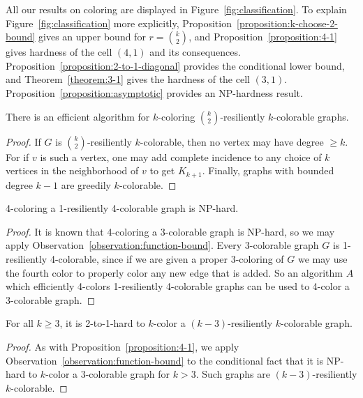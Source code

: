 All our results on coloring are displayed in Figure~\ref{fig:classification}.
To explain Figure~\ref{fig:classification} more explicitly,
Proposition~\ref{proposition:k-choose-2-bound} gives an upper bound for $r=
\binom{k}{2}$, and Proposition~\ref{proposition:4-1} gives hardness of the cell
$(4,1)$ and its consequences. Proposition~\ref{proposition:2-to-1-diagonal} provides
the conditional lower bound, and Theorem~\ref{theorem:3-1} gives the hardness of
the cell $(3,1)$. Proposition~\ref{proposition:asymptotic} provides an NP-hardness
result.

\begin{proposition}\label{proposition:k-choose-2-bound}
There is an efficient algorithm for $k$-coloring $\binom{k}{2}$-resiliently
$k$-colorable graphs.
\end{proposition}
\begin{proof}
If $G$ is $\binom{k}{2}$-resiliently $k$-colorable, then no vertex may have
degree $ \geq k$. For if $v$ is such a vertex, one may add complete incidence to
any choice of $k$ vertices in the neighborhood of $v$ to get $K_{k+1}$. Finally,
graphs with bounded degree $k-1$ are greedily $k$-colorable. 
\end{proof}

\begin{proposition}\label{proposition:4-1}
4-coloring a 1-resiliently 4-colorable graph is NP-hard.
\end{proposition}
\begin{proof}
It is known that 4-coloring a 3-colorable graph is NP-hard, so we may apply
Observation~\ref{observation:function-bound}. Every 3-colorable graph $G$ is
1-resiliently 4-colorable, since if we are given a proper 3-coloring of $G$ we
may use the fourth color to properly color any new edge that is added. So an
algorithm $A$ which efficiently 4-colors 1-resiliently 4-colorable graphs can
be used to 4-color a 3-colorable graph. 
\end{proof}

\begin{proposition}\label{proposition:2-to-1-diagonal}
For all $k \geq 3$, it is 2-to-1-hard to $k$-color a $(k-3)$-resiliently
$k$-colorable graph. 
\end{proposition}
\begin{proof}
As with Proposition~\ref{proposition:4-1}, we apply
Observation~\ref{observation:function-bound} to the conditional fact that it is NP-hard
to $k$-color a 3-colorable graph for $k > 3$. Such graphs are
$(k-3)$-resiliently $k$-colorable. 
\end{proof}

